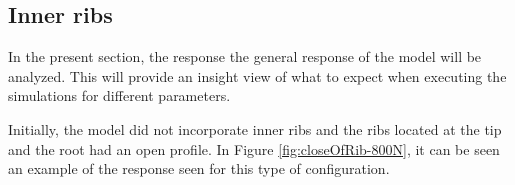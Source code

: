   \subsection{Inner ribs} \label{subsec:finalConfiguration_results_model}

    In the present section, the response the general response of the model will be analyzed. This will provide an insight view of what to expect when executing the simulations for different parameters.

    Initially, the model did not incorporate inner ribs and the ribs located at the tip and the root had an open profile. In Figure \ref{fig:closeOfRib-800N}, it can be seen an example of the response seen for this type of configuration.

